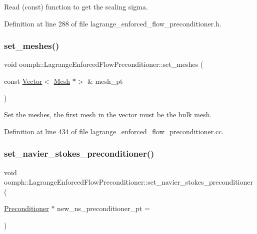 Read (const) function to get the scaling sigma. 



Definition at line 288 of file lagrange\+\_\+enforced\+\_\+flow\+\_\+preconditioner.\+h.

\mbox{\label{classoomph_1_1LagrangeEnforcedFlowPreconditioner_a8493d20c5e5d4bbdc3f1b3fd22de2ce3}} 
\subsubsection{\texorpdfstring{set\+\_\+meshes()}{set\_meshes()}}
{\footnotesize\ttfamily void oomph\+::\+Lagrange\+Enforced\+Flow\+Preconditioner\+::set\+\_\+meshes (\begin{DoxyParamCaption}\item[{const \hyperlink{classoomph_1_1Vector}{Vector}$<$ \hyperlink{classoomph_1_1Mesh}{Mesh} $\ast$$>$ \&}]{mesh\+\_\+pt }\end{DoxyParamCaption})}



Set the meshes, the first mesh in the vector must be the bulk mesh. 



Definition at line 434 of file lagrange\+\_\+enforced\+\_\+flow\+\_\+preconditioner.\+cc.

\mbox{\label{classoomph_1_1LagrangeEnforcedFlowPreconditioner_a3512f2a0c6b03977590591a81846c50d}} 
\subsubsection{\texorpdfstring{set\+\_\+navier\+\_\+stokes\+\_\+preconditioner()}{set\_navier\_stokes\_preconditioner()}}
{\footnotesize\ttfamily void oomph\+::\+Lagrange\+Enforced\+Flow\+Preconditioner\+::set\+\_\+navier\+\_\+stokes\+\_\+preconditioner (\begin{DoxyParamCaption}\item[{\hyperlink{classoomph_1_1Preconditioner}{Preconditioner} $\ast$}]{new\+\_\+ns\+\_\+preconditioner\+\_\+pt = {} }\end{DoxyParamCaption})}



